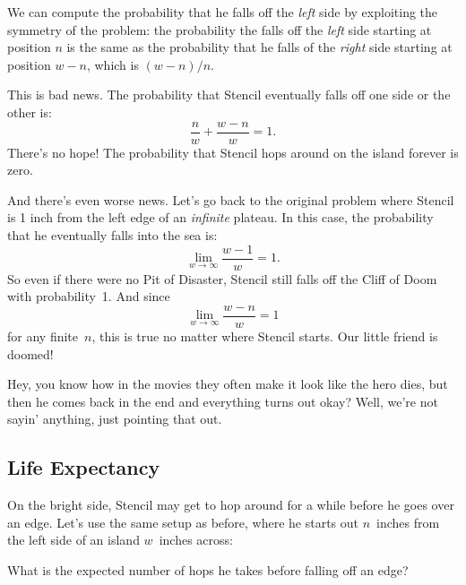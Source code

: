 We can compute the probability that he falls off the \emph{left}
side by exploiting the symmetry of the problem: the probability the
falls off the \emph{left} side starting at position $n$ is the same
as the probability that he falls of the \emph{right} side starting
at position $w - n$, which is $(w - n) / n$.

This is bad news.  The probability that Stencil eventually falls off
one side or the other is:
%
\[
    \frac{n}{w} + \frac{w - n}{w} = 1.
\]
%
There's no hope!  The probability that Stencil hops around on the
island forever is zero.

And there's even worse news.  Let's go back to the original problem
where Stencil is 1 inch from the left edge of an \emph{infinite}
plateau.  In this case, the probability that he eventually falls into
the sea is:
%
\[
    \lim_{w \to \infty} \frac{w - 1}{w} = 1.
\]
So even if there were no Pit of Disaster, Stencil still falls off the
Cliff of Doom with probability~1.  And since
\begin{equation*}
    \lim_{w \to \infty} \frac{w - n }{w} = 1
\end{equation*}
for any finite~$n$, this is true no matter where Stencil starts.  Our
little friend is doomed!

Hey, you know how in the movies they often make it look like the hero
dies, but then he comes back in the end and everything turns out okay?
Well, we're not sayin' anything, just pointing that out.

\subsection{Life Expectancy}

On the bright side, Stencil may get to hop around for a while before
he goes over an edge.  Let's use the same setup as before, where he
starts out $n$~inches from the left side of an island $w$~inches
across:
%
\begin{figure}[h]
\end{figure}
%
What is the expected number of hops he takes before falling off an
edge?

